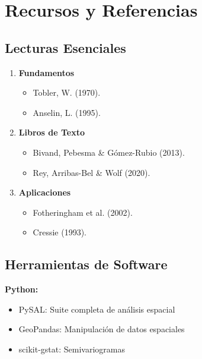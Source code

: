 \documentclass[12pt,a4paper]{article}
\begin{document}
\section{Recursos y Referencias}

\subsection{Lecturas Esenciales}

\begin{enumerate}
    \item \textbf{Fundamentos}
    \begin{itemize}
        \item Tobler, W. (1970). 
        \item Anselin, L. (1995). 
    \end{itemize}
    
    \item \textbf{Libros de Texto}
    \begin{itemize}
        \item Bivand, Pebesma \& Gómez-Rubio (2013). 
        \item Rey, Arribas-Bel \& Wolf (2020). 
    \end{itemize}
    
    \item \textbf{Aplicaciones}
    \begin{itemize}
        \item Fotheringham et al. (2002). 
        \item Cressie (1993). 
    \end{itemize}
\end{enumerate}

\subsection{Herramientas de Software}

\textbf{Python:}
\begin{itemize}
    \item PySAL: Suite completa de análisis espacial
    \item GeoPandas: Manipulación de datos espaciales
    \item scikit-gstat: Semivariogramas
\end{itemize}
\end{document}
